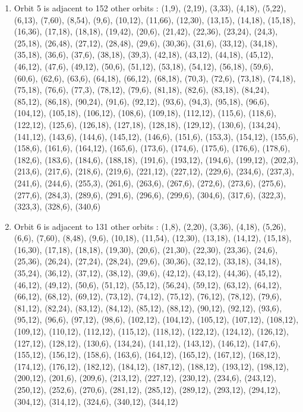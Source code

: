 \documentclass[12pt]{article}
\begin{document}
\begin{enumerate}
\item Orbit 5 is adjacent to 152 other orbits : (1,9), (2,19), (3,33), (4,18), (5,22), (6,13), (7,60), (8,54), (9,6), (10,12), (11,66), (12,30), (13,15), (14,18), (15,18), (16,36), (17,18), (18,18), (19,42), (20,6), (21,42), (22,36), (23,24), (24,3), (25,18), (26,48), (27,12), (28,48), (29,6), (30,36), (31,6), (33,12), (34,18), (35,18), (36,6), (37,6), (38,18), (39,3), (42,18), (43,12), (44,18), (45,12), (46,12), (47,6), (49,12), (50,6), (51,12), (53,18), (54,12), (56,18), (59,6), (60,6), (62,6), (63,6), (64,18), (66,12), (68,18), (70,3), (72,6), (73,18), (74,18), (75,18), (76,6), (77,3), (78,12), (79,6), (81,18), (82,6), (83,18), (84,24), (85,12), (86,18), (90,24), (91,6), (92,12), (93,6), (94,3), (95,18), (96,6), (104,12), (105,18), (106,12), (108,6), (109,18), (112,12), (115,6), (118,6), (122,12), (125,6), (126,18), (127,18), (128,18), (129,12), (130,6), (134,24), (141,12), (143,6), (144,6), (145,12), (146,6), (151,6), (153,3), (154,12), (155,6), (158,6), (161,6), (164,12), (165,6), (173,6), (174,6), (175,6), (176,6), (178,6), (182,6), (183,6), (184,6), (188,18), (191,6), (193,12), (194,6), (199,12), (202,3), (213,6), (217,6), (218,6), (219,6), (221,12), (227,12), (229,6), (234,6), (237,3), (241,6), (244,6), (255,3), (261,6), (263,6), (267,6), (272,6), (273,6), (275,6), (277,6), (284,3), (289,6), (291,6), (296,6), (299,6), (304,6), (317,6), (322,3), (323,3), (328,6), (340,6)
\item Orbit 6 is adjacent to 131 other orbits : (1,8), (2,20), (3,36), (4,18), (5,26), (6,6), (7,60), (8,48), (9,6), (10,18), (11,54), (12,30), (13,18), (14,12), (15,18), (16,30), (17,18), (18,18), (19,30), (20,6), (21,30), (22,30), (23,36), (24,6), (25,36), (26,24), (27,24), (28,24), (29,6), (30,36), (32,12), (33,18), (34,18), (35,24), (36,12), (37,12), (38,12), (39,6), (42,12), (43,12), (44,36), (45,12), (46,12), (49,12), (50,6), (51,12), (55,12), (56,24), (59,12), (63,12), (64,12), (66,12), (68,12), (69,12), (73,12), (74,12), (75,12), (76,12), (78,12), (79,6), (81,12), (82,24), (83,12), (84,12), (85,12), (88,12), (90,12), (92,12), (93,6), (95,12), (96,6), (97,12), (98,6), (102,12), (104,12), (105,12), (107,12), (108,12), (109,12), (110,12), (112,12), (115,12), (118,12), (122,12), (124,12), (126,12), (127,12), (128,12), (130,6), (134,24), (141,12), (143,12), (146,12), (147,6), (155,12), (156,12), (158,6), (163,6), (164,12), (165,12), (167,12), (168,12), (174,12), (176,12), (182,12), (184,12), (187,12), (188,12), (193,12), (198,12), (200,12), (201,6), (209,6), (213,12), (227,12), (230,12), (234,6), (243,12), (250,12), (252,6), (270,6), (281,12), (285,12), (289,12), (293,12), (294,12), (304,12), (314,12), (324,6), (340,12), (344,12)

\end{enumerate}
\end{document}

